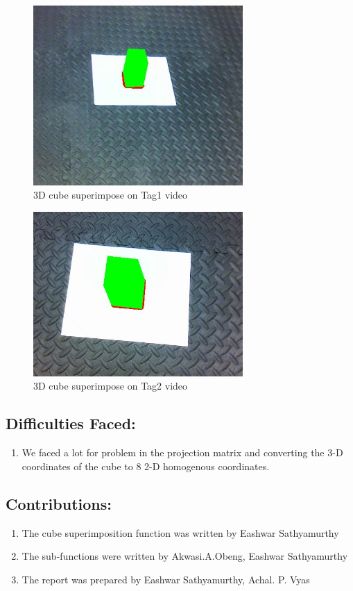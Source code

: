 \documentclass[12pt]{article}
\begin{document}
\begin{figure}[h]
    \centering
    \includegraphics[width=8cm]{Tag1_cube}
    \caption{3D cube superimpose on Tag1 video}
    \label{fig:video frame output}
\end{figure}
\newpage
\begin{figure}[h]
    \centering
    \includegraphics[width=8cm]{Tag2_cube}
    \caption{3D cube superimpose on Tag2 video}
    \label{fig:video frame output}
\end{figure}
\subsection{Difficulties Faced:}
\begin{enumerate}
\item We faced a lot for problem in the projection matrix and converting the 3-D coordinates of the cube to 8 2-D homogenous coordinates.
\end{enumerate}
\subsection{Contributions:}
\begin{enumerate}
\item The cube superimposition function was written by Eashwar Sathyamurthy
\item The sub-functions were written by Akwasi.A.Obeng, Eashwar Sathyamurthy 
\item The report was prepared by Eashwar Sathyamurthy, Achal. P. Vyas

\end{enumerate}
\end{document}
